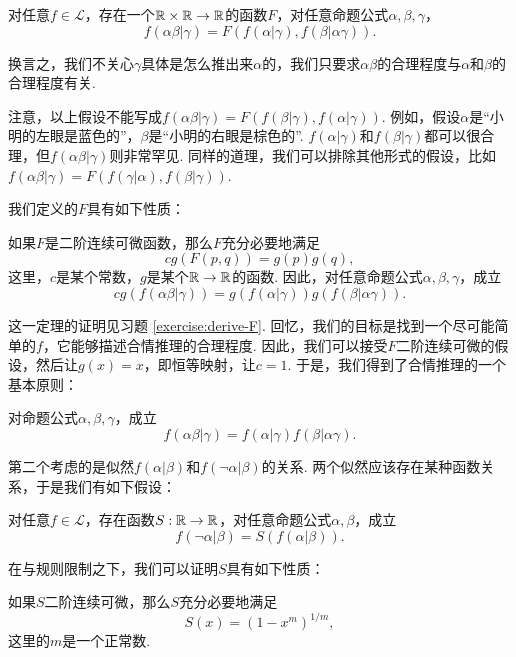 \begin{hypothesis}\label{hypothesis:form-of-F}
    对任意$f\in\mathcal L$，存在一个$\mathbb{R}\times\mathbb{R}\to\mathbb{R}$的函数$F$，对任意命题公式$\alpha,\beta,\gamma$，
    \[
        f(\alpha\beta|\gamma)=F(f(\alpha|\gamma),f(\beta|\alpha\gamma)).
    \]
\end{hypothesis}

换言之，我们不关心$\gamma$具体是怎么推出来$\alpha$的，我们只要求$\alpha\beta$的合理程度与$\alpha$和$\beta$的合理程度有关. 

注意，以上假设不能写成$f(\alpha\beta|\gamma) = F(f(\beta|\gamma), f(\alpha|\gamma))$. 例如，假设$\alpha$是“小明的左眼是蓝色的”，$\beta$是“小明的右眼是棕色的”. $f(\alpha|\gamma)$和$f(\beta|\gamma)$都可以很合理，但$f(\alpha\beta|\gamma)$则非常罕见. 同样的道理，我们可以排除其他形式的假设，比如$f(\alpha\beta|\gamma) = F(f(\gamma|\alpha), f(\beta|\gamma))$.

我们定义的$F$具有如下性质：
\begin{theorem}\label{theorem:form-of-F}
    如果$F$是二阶连续可微函数，那么$F$充分必要地满足
        \[cg(F(p,q))=g(p)g(q),\]
        这里，$c$是某个常数，$g$是某个$\mathbb{R}\to\mathbb{R}$的函数.
        因此，对任意命题公式$\alpha,\beta,\gamma$，成立
        \[cg(f(\alpha\beta|\gamma))=g(f(\alpha|\gamma))g(f(\beta|\alpha\gamma)).\]
\end{theorem}

这一定理的证明见习题 \ref{exercise:derive-F}. 回忆，我们的目标是找到一个尽可能简单的$f$，它能够描述合情推理的合理程度. 因此，我们可以接受$F$二阶连续可微的假设，然后让$g(x)=x$，即恒等映射，让$c=1$. 于是，我们得到了合情推理的一个基本原则：
\begin{principle}[与规则]
对命题公式$\alpha,\beta,\gamma$，成立
\[f(\alpha\beta|\gamma)=f(\alpha|\gamma)f(\beta|\alpha\gamma).\]
\end{principle}

第二个考虑的是似然$f(\alpha|\beta)$和$f(\neg\alpha|\beta)$的关系. 两个似然应该存在某种函数关系，于是我们有如下假设：

\begin{hypothesis}
    对任意$f\in\mathcal L$，存在函数$S:\mathbb{R}\to\mathbb{R}$，对任意命题公式$\alpha,\beta$，成立
    \[f(\neg\alpha|\beta)=S(f(\alpha|\beta)).\]
\end{hypothesis}

在与规则限制之下，我们可以证明$S$具有如下性质：
\begin{theorem}\label{theorem:form-of-S}
    如果$S$二阶连续可微，那么$S$充分必要地满足
    \begin{equation*}
        S(x) = (1 - x^m)^{1/m},
    \end{equation*}
    这里的$m$是一个正常数.
\end{theorem}

